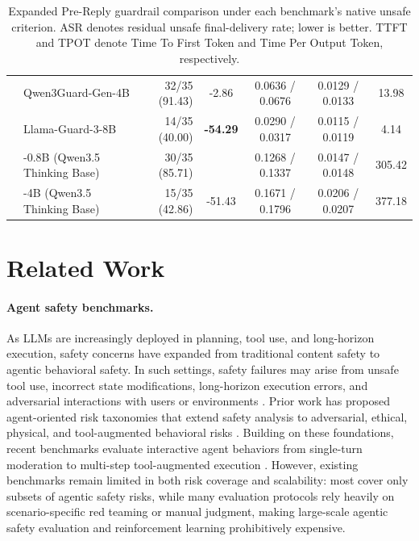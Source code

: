\documentclass{llmxive}
\providecommand{\toolAG}{{\agentdog{}}\xspace}
\providecommand{\prereply}{{Pre-Reply}\xspace}
\providecommand{\agentdog}{AgentDoG~1.5\xspace}
\providecommand{\qwenguard}{Qwen3Guard-Gen-4B\xspace}
\providecommand{\llamaguard}{Llama-Guard-3-8B\xspace}
\begin{document}
\begin{table}[t]
{\begin{tabular}{llrcccc}
& \qwenguard
& 32/35 (91.43) & -2.86 & 0.0636 / 0.0676 & 0.0129 / 0.0133 & 13.98 \\
& \llamaguard
& 14/35 (40.00) & \textbf{-54.29} & 0.0290 / 0.0317 & 0.0115 / 0.0119 & 4.14 \\
& \cellcolor{AgentDoGColor!15}\toolAG{}-0.8B (Qwen3.5 Thinking Base)
& \cellcolor{AgentDoGColor!15}30/35 (85.71) & \cellcolor{AgentDoGColor!15}{-8.57} & \cellcolor{AgentDoGColor!15}0.1268 / 0.1337 & \cellcolor{AgentDoGColor!15}0.0147 / 0.0148 & \cellcolor{AgentDoGColor!15}305.42 \\
& \cellcolor{AgentDoGColor!15}\toolAG{}-4B (Qwen3.5 Thinking Base)
& \cellcolor{AgentDoGColor!15}15/35 (42.86) & \cellcolor{AgentDoGColor!15}-51.43 & \cellcolor{AgentDoGColor!15}0.1671 / 0.1796 & \cellcolor{AgentDoGColor!15}0.0206 / 0.0207 & \cellcolor{AgentDoGColor!15}377.18 \\
\bottomrule
\end{tabular}%
}
\vspace{-10pt}
\caption{Expanded \prereply{} guardrail comparison under each benchmark's native unsafe criterion. ASR denotes residual unsafe final-delivery rate; lower is better. TTFT and TPOT denote Time To First Token and Time Per Output Token, respectively.}
\label{tab:guardrail_4way_results}
\end{table}



\section{Related Work}

\paragraph{Agent safety benchmarks.} As LLMs are increasingly deployed in planning, tool use, and long-horizon execution, safety concerns have expanded from traditional content safety to agentic behavioral safety. In such settings, safety failures may arise from unsafe tool use, incorrect state modifications, long-horizon execution errors, and adversarial interactions with users or environments \citep{ghosh2025safety, rjudge2024, zhang2024agentsafetybench, tur2025safearena, guo2025upwarddeceivers, verma2024operationalizing}. Prior work has proposed agent-oriented risk taxonomies that extend safety analysis to adversarial, ethical, physical, and tool-augmented behavioral risks \citep{agentharm2024, zheng2024ali,luo2025agentauditor}. Building on these foundations, recent benchmarks evaluate interactive agent behaviors from single-turn moderation to multi-step tool-augmented execution \citep{rjudge2024, zhang2024agentsafetybench, os-harm2025, riosworld2025, injecagent2024, toolsword2024, safetoolbench2025, agentdojo2024, tur2025safearena, li2026agentdyn, zhang2025agent, chen2026decodingtrustagentplatformdtapcontrollable}. However, existing benchmarks remain limited in both risk coverage and scalability: most cover only subsets of agentic safety risks, while many evaluation protocols rely heavily on scenario-specific red teaming or manual judgment, making large-scale agentic safety evaluation and reinforcement learning prohibitively expensive.
\end{document}
